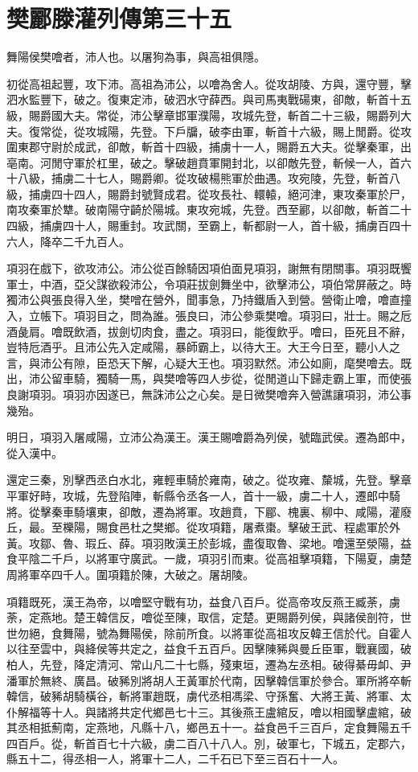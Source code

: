 \chapter{樊酈滕灌列傳第三十五}

舞陽侯樊噲者，沛人也。以屠狗為事，與高祖俱隱。

初從高祖起豐，攻下沛。高祖為沛公，以噲為舍人。從攻胡陵、方與，還守豐，擊泗水監豐下，破之。復東定沛，破泗水守薛西。與司馬夷戰碭東，卻敵，斬首十五級，賜爵國大夫。常從，沛公擊章邯軍濮陽，攻城先登，斬首二十三級，賜爵列大夫。復常從，從攻城陽，先登。下戶牖，破李由軍，斬首十六級，賜上閒爵。從攻圍東郡守尉於成武，卻敵，斬首十四級，捕虜十一人，賜爵五大夫。從擊秦軍，出亳南。河閒守軍於杠里，破之。擊破趙賁軍開封北，以卻敵先登，斬候一人，首六十八級，捕虜二十七人，賜爵卿。從攻破楊熊軍於曲遇。攻宛陵，先登，斬首八級，捕虜四十四人，賜爵封號賢成君。從攻長社、轘轅，絕河津，東攻秦軍於尸，南攻秦軍於犨。破南陽守齮於陽城。東攻宛城，先登。西至酈，以卻敵，斬首二十四級，捕虜四十人，賜重封。攻武關，至霸上，斬都尉一人，首十級，捕虜百四十六人，降卒二千九百人。

項羽在戲下，欲攻沛公。沛公從百餘騎因項伯面見項羽，謝無有閉關事。項羽既饗軍士，中酒，亞父謀欲殺沛公，令項莊拔劍舞坐中，欲擊沛公，項伯常屏蔽之。時獨沛公與張良得入坐，樊噌在營外，聞事急，乃持鐵盾入到營。營衛止噲，噲直撞入，立帳下。項羽目之，問為誰。張良曰，沛公參乘樊噲。項羽曰，壯士。賜之卮酒彘肩。噲既飲酒，拔劍切肉食，盡之。項羽曰，能復飲乎。噲曰，臣死且不辭，豈特卮酒乎。且沛公先入定咸陽，暴師霸上，以待大王。大王今日至，聽小人之言，與沛公有隙，臣恐天下解，心疑大王也。項羽默然。沛公如廁，麾樊噲去。既出，沛公留車騎，獨騎一馬，與樊噲等四人步從，從閒道山下歸走霸上軍，而使張良謝項羽。項羽亦因遂已，無誅沛公之心矣。是日微樊噲奔入營譙讓項羽，沛公事幾殆。

明日，項羽入屠咸陽，立沛公為漢王。漢王賜噲爵為列侯，號臨武侯。遷為郎中，從入漢中。

還定三秦，別擊西丞白水北，雍輕車騎於雍南，破之。從攻雍、斄城，先登。擊章平軍好畤，攻城，先登陷陣，斬縣令丞各一人，首十一級，虜二十人，遷郎中騎將。從擊秦車騎壤東，卻敵，遷為將軍。攻趙賁，下郿、槐裏、柳中、咸陽，灌廢丘，最。至櫟陽，賜食邑杜之樊鄉。從攻項籍，屠煮棗。擊破王武、程處軍於外黃。攻鄒、魯、瑕丘、薛。項羽敗漢王於彭城，盡復取魯、梁地。噲還至滎陽，益食平陰二千戶，以將軍守廣武。一歲，項羽引而東。從高祖擊項籍，下陽夏，虜楚周將軍卒四千人。圍項籍於陳，大破之。屠胡陵。

項籍既死，漢王為帝，以噲堅守戰有功，益食八百戶。從高帝攻反燕王臧荼，虜荼，定燕地。楚王韓信反，噲從至陳，取信，定楚。更賜爵列侯，與諸侯剖符，世世勿絕，食舞陽，號為舞陽侯，除前所食。以將軍從高祖攻反韓王信於代。自霍人以往至雲中，與絳侯等共定之，益食千五百戶。因擊陳豨與曼丘臣軍，戰襄國，破柏人，先登，降定清河、常山凡二十七縣，殘東垣，遷為左丞相。破得綦毋卹、尹潘軍於無終、廣昌。破豨別將胡人王黃軍於代南，因擊韓信軍於參合。軍所將卒斬韓信，破豨胡騎橫谷，斬將軍趙既，虜代丞相馮梁、守孫奮、大將王黃、將軍、太仆解福等十人。與諸將共定代鄉邑七十三。其後燕王盧綰反，噲以相國擊盧綰，破其丞相抵薊南，定燕地，凡縣十八，鄉邑五十一。益食邑千三百戶，定食舞陽五千四百戶。從，斬首百七十六級，虜二百八十八人。別，破軍七，下城五，定郡六，縣五十二，得丞相一人，將軍十二人，二千石已下至三百石十一人。

